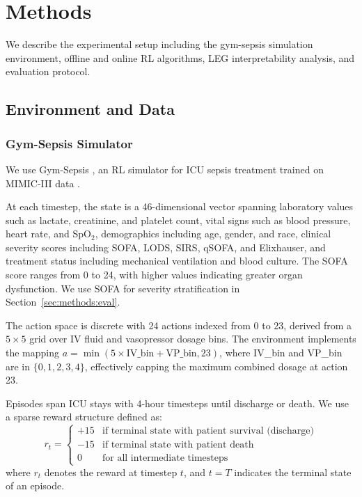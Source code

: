 
\section{Methods}\label{sec:methods}

We describe the experimental setup including the gym-sepsis simulation environment, offline and online RL algorithms, LEG interpretability analysis, and evaluation protocol.

\subsection{Environment and Data}\label{sec:methods:env}

\subsubsection{Gym-Sepsis Simulator}

We use Gym-Sepsis \citep{raghu2017sepsis_drl}, an RL simulator for ICU sepsis treatment trained on MIMIC-III data \citep{johnson2016mimic3}.

At each timestep, the state is a 46-dimensional vector spanning laboratory values such as lactate, creatinine, and platelet count, vital signs such as blood pressure, heart rate, and SpO$_2$, demographics including age, gender, and race, clinical severity scores including SOFA, LODS, SIRS, qSOFA, and Elixhauser, and treatment status including mechanical ventilation and blood culture. The SOFA score \citep{vincent1996sofa} ranges from 0 to 24, with higher values indicating greater organ dysfunction. We use SOFA for severity stratification in Section~\ref{sec:methods:eval}.

The action space is discrete with 24 actions indexed from 0 to 23, derived from a $5 \times 5$ grid over IV fluid and vasopressor dosage bins. The environment implements the mapping $a = \min(5 \times \text{IV\_bin} + \text{VP\_bin}, 23)$, where IV\_bin and VP\_bin are in $\{0, 1, 2, 3, 4\}$, effectively capping the maximum combined dosage at action 23.

Episodes span ICU stays with 4-hour timesteps until discharge or death. We use a sparse reward structure defined as:
\begin{equation}
r_t = \begin{cases}
+15 & \text{if terminal state with patient survival (discharge)} \\
-15 & \text{if terminal state with patient death} \\
0 & \text{for all intermediate timesteps}
\end{cases}
\label{eq:reward}
\end{equation}
where $r_t$ denotes the reward at timestep $t$, and $t = T$ indicates the terminal state of an episode.

